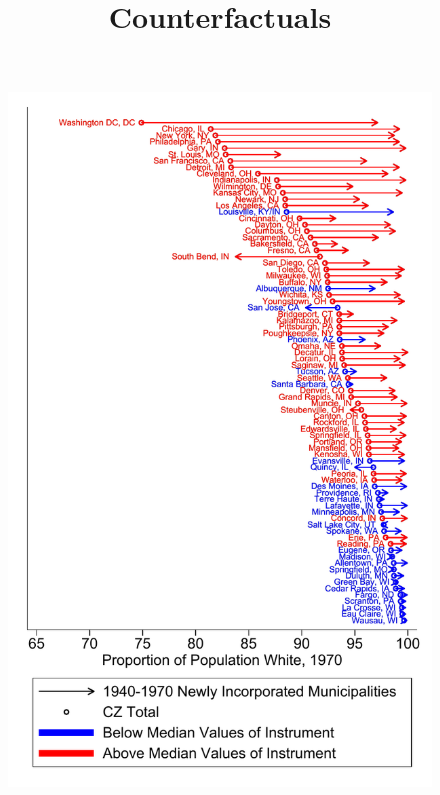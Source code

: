 \documentclass{article}
\title{Counterfactuals}
\begin{document}
\maketitle

{\footnotesize }
\begin{figure}
	\includegraphics{figures/pcarrow_figure_GM.pdf}
\end{figure}
\clearpage
\end{document}
